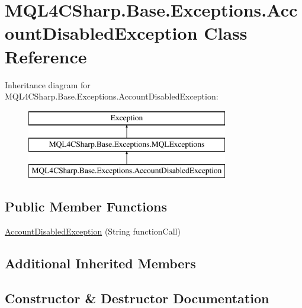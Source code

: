\hypertarget{class_m_q_l4_c_sharp_1_1_base_1_1_exceptions_1_1_account_disabled_exception}{}\section{M\+Q\+L4\+C\+Sharp.\+Base.\+Exceptions.\+Account\+Disabled\+Exception Class Reference}
\label{class_m_q_l4_c_sharp_1_1_base_1_1_exceptions_1_1_account_disabled_exception}
Inheritance diagram for M\+Q\+L4\+C\+Sharp.\+Base.\+Exceptions.\+Account\+Disabled\+Exception\+:\begin{figure}[H]
\begin{center}
\leavevmode
\includegraphics[height=3.000000cm]{class_m_q_l4_c_sharp_1_1_base_1_1_exceptions_1_1_account_disabled_exception}
\end{center}
\end{figure}
\subsection*{Public Member Functions}
\begin{DoxyCompactItemize}
\item 
\hyperlink{class_m_q_l4_c_sharp_1_1_base_1_1_exceptions_1_1_account_disabled_exception_acbc98d2ad0b120c7d33db3fec4a0482c}{Account\+Disabled\+Exception} (String function\+Call)
\end{DoxyCompactItemize}
\subsection*{Additional Inherited Members}


\subsection{Constructor \& Destructor Documentation}
